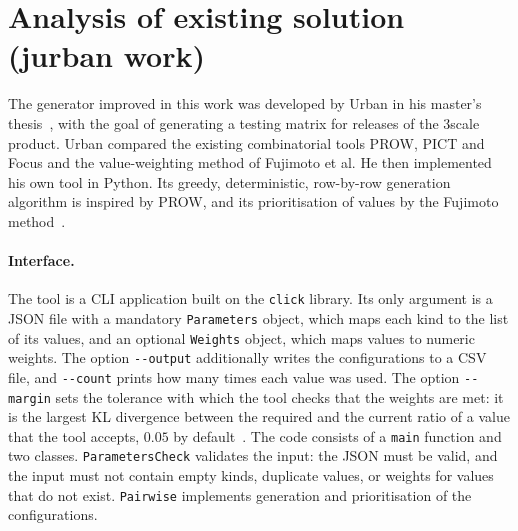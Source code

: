 \documentclass[
  digital, %
  oneside, %
  lof,     %
  nolot,     %
]{fithesis4}
\begin{document}
\section{Analysis of existing solution (jurban work)}
\label{sec:existing-solution}
The generator improved in this work was developed by Urban in his master's
thesis~\cite{Urban2024thesis}, with the goal of generating a testing matrix for
releases of the 3scale product. Urban compared the existing combinatorial tools
PROW, PICT and Focus and the value-weighting method of Fujimoto et al. He then
implemented his own tool in Python. Its greedy, deterministic, row-by-row
generation algorithm is inspired by PROW, and its prioritisation of values by
the Fujimoto method~\cite[pp.~16--22]{Urban2024thesis}.

\paragraph{Interface.} The tool is a \gls{CLI} application built on the
\texttt{click} library. Its only argument is a \gls{JSON} file with a mandatory
\texttt{Parameters} object, which maps each kind to the list of its values, and
an optional \texttt{Weights} object, which maps values to numeric weights.
The option \texttt{-{}-output} additionally writes the configurations to a
\gls{CSV} file, and \texttt{-{}-count} prints how many times each value was
used. The option \texttt{-{}-margin} sets the tolerance with which the tool
checks that the weights are met: it is the largest \gls{KL} divergence between
the required and the current ratio of a value that the tool accepts, $0.05$ by
default~\cite[pp.~23--24]{Urban2024thesis}. The code consists of a
\texttt{main} function and two classes. \texttt{ParametersCheck} validates the
input: the \gls{JSON} must be valid, and the input must not contain empty
kinds, duplicate values, or weights for values that do not exist.
\texttt{Pairwise} implements generation and prioritisation of the configurations.
\end{document}
